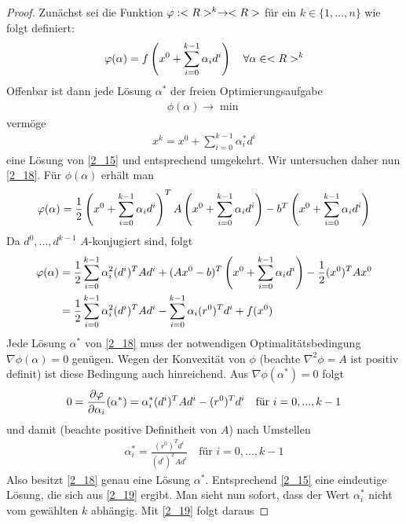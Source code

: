 \begin{proof}
	Zunächst sei die Funktion $\phi:\R^k\to\R$ für ein $k\in\{1,...,n\}$ wie folgt definiert:
	\begin{align}
		\phi(\alpha) = f\left(x ^0+\sum_{i=0}^{k-1}\alpha_id^i\right)\quad\forall\alpha\in\R^k\notag
	\end{align}
	Offenbar ist dann jede Lösung $\alpha^\ast$ der freien Optimierungsaufgabe 
	\begin{align}
		\label{2_18}
		\phi(\alpha)\to\min
	\end{align}
	vermöge
	\begin{align}
		\label{2_19}
		x^k = x^0+\sum_{i=0}^{k-1}\alpha^\ast_id^i
	\end{align}
	eine Lösung von \cref{2_15} und entsprechend umgekehrt. Wir untersuchen daher nun \cref{2_18}. Für $\phi(\alpha)$ erhält man
	\begin{align}
		\phi(\alpha) = \frac{1}{2}\left(x^0+\sum_{i=0}^{k-1}\alpha_id^i\right)^TA\left(x^0+\sum_{i=0}^{k-1}\alpha_id^i\right) - b^T\left(x^0+\sum_{i=0}^{k-1}\alpha_id^i\right)\notag
	\end{align}
	Da $d^0,...,d^{k-1}$ $A$-konjugiert sind, folgt
	\begin{align}
		\phi(\alpha) &= \frac{1}{2}\sum_{i=0}^{k-1}\alpha_i^2(d^i)^TAd^i + (Ax^0-b)^T\left(x^0 + \sum_{i=0}^{k-1}\alpha_i d^i\right) - \frac{1}{2}(x^0)^TAx^0 \notag \\
		&= \frac{1}{2}\sum_{i=0}^{k-1}\alpha_i^2(d^i)^TAd^i - \sum_{i=0}^{k-1}\alpha_i(r^0)^Td^i + f(x^0)\notag
	\end{align}
	Jede Lösung $\alpha^\ast$ von \cref{2_18} muss der notwendigen Optimalitätsbedingung $\nabla\phi(\alpha)=0$ genügen. Wegen der Konvexität von $\phi$ (beachte $\nabla^2\phi = A$ ist positiv definit) ist diese Bedingung auch hinreichend. Aus $\nabla\phi(\alpha^\ast)=0$ folgt
	\begin{align}
		0=\frac{\partial \phi}{\partial\alpha_i}(\alpha^\ast) =\alpha^\ast_i(d^i)^TAd^i-(r^0)^Td^i\quad\text{für } i=0,...,k-1\notag 
	\end{align}
	und damit (beachte positive Definitheit von $A$) nach Umstellen
	\begin{align}
		\label{2_20}
		\alpha_i^\ast = \frac{(r^0)^Td^i}{(d^i)^TAd^i}\quad\text{für } i=0,...,k-1
	\end{align}
	Also besitzt \cref{2_18} genau eine Lösung $\alpha^\ast$. Entsprechend \cref{2_15} eine eindeutige Lösung, die sich aus \cref{2_19} ergibt. Man sieht nun sofort, dass der Wert $\alpha_i^\ast$ nicht vom gewählten $k$ abhängig. Mit \cref{2_19} folgt daraus

\end{proof}

